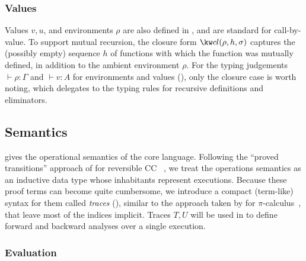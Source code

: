 \subsubsection{Values}
Values $v, u$, and environments $\rho$ are also defined in , and are standard for call-by-value. To support mutual recursion, the closure form  $\exClosure{\rho}{h}{\sigma}$ captures the (possibly empty) sequence $h$ of functions with which the function was mutually defined, in addition to the ambient environment $\rho$. For the typing judgements $\vdash \rho: \Gamma$ and $\vdash v: A$ for environments and values (), only the closure case is worth noting, which delegates to the typing rules for recursive definitions and eliminators.

\subsection{Semantics}

 gives the operational semantics of the core language. Following the ``proved transitions'' approach of \citeauthor{boudol89} for reversible CC~ \cite{boudol89}, we treat the operations semantics as an inductive data type whose inhabitants represent executions. Because these proof terms can become quite cumbersome, we introduce a compact (term-like) syntax for them called \emph{traces} (), similar to the approach taken by \citeauthor{perera16d} for $\pi$-calculus~\cite{perera16d}, that leave most of the indices implicit. Traces $T, U$ will be used in  to define forward and backward analyses over a single execution.

\subsubsection{Evaluation}
\label{sec:core-language:eval}

